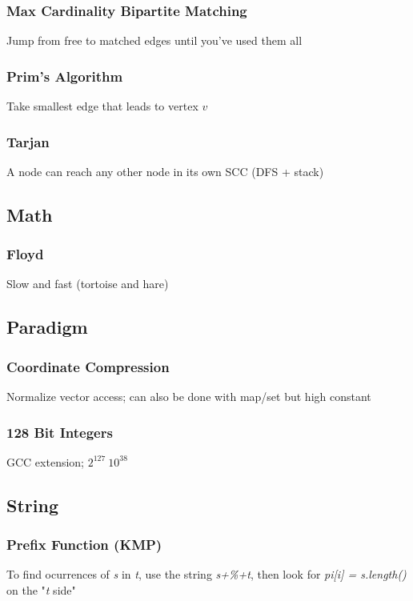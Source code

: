 \documentclass[12pt, a4paper, twoside]{article}
\begin{document}
\subsubsection{Max Cardinality Bipartite Matching}
Jump from free to matched edges until you've used them all

\subsubsection{Prim's Algorithm}
Take smallest edge that leads to vertex $v$

\subsubsection{Tarjan}
A node can reach any other node in its own SCC (DFS + stack)

\subsection{Math}
\subsubsection{Floyd}
Slow and fast (tortoise and hare)

\subsection{Paradigm}
\subsubsection{Coordinate Compression}
Normalize vector access; can also be done with map/set but high constant

\subsubsection{128 Bit Integers}
GCC extension; $2^{127} ~ 10^{38}$

\subsection{String}
\subsubsection{Prefix Function (KMP)}
To find ocurrences of \textit{s} in \textit{t}, use the string \textit{s+\%+t}, then look for \textit{pi[i] = s.length()} on the "\textit{t} side"
\end{document}

